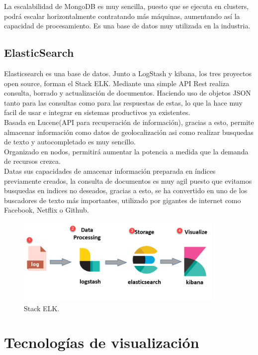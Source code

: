\documentclass[11pt,a4paper]{book}
\begin{document}
				La escalabilidad de MongoDB es muy sencilla, puesto que se ejecuta en clusters, podrá escalar horizontalmente contratando más máquinas, aumentando así la capacidad de procesamiento. Es una base de datos muy utilizada en la industria.
			\subsection{ElasticSearch}
				Elasticsearch es una base de datos. Junto a LogStash y kibana, los tres proyectos open source, forman el Stack ELK. Mediante una simple API Rest realiza consulta, borrado y actualización de documentos. Haciendo uso de objetos JSON tanto para las consultas como para las respuestas de estas, lo que la hace muy facil de usar e integrar en sistemas productivos ya existentes.\\
				
				Basada en Lucene(API para recuperación de información), gracias a esto, permite almacenar información como datos de geolocalización asi como realizar busquedas de texto y autocompletado es muy sencillo.\\
		
				Organizado en nodos, permitirá aumentar la potencia a medida que la demanda de recursos crezca.\\
				
				Datas sus capacidades de amacenar información preparada en índices previamente creados, la consulta de documentos es muy agil puesto que evitamos busquedas en indices no deseados, gracias a esto, se ha convertido en uno de los buscadores de texto más importantes, utilizado por gigantes de internet como Facebook, Netflix o Github.

			\begin{figure}
				\centering
				\includegraphics[width=10cm, keepaspectratio]{img/ELK_Stack.png}
				\caption{Stack ELK.}
				\label{fig:MTV_Django}
			\end{figure}
		
		\section{Tecnologías de visualización}
\end{document}
